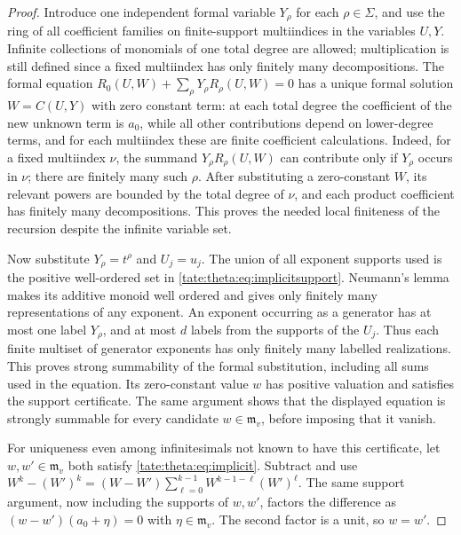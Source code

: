 \documentclass[11pt,letterpaper]{article}
\theoremstyle{definition}
\newcommand{\m}{\mathfrak m}
\begin{document}
\begin{proof}
Introduce one independent formal variable $Y_\rho$ for each
$\rho\in\Sigma$, and use the ring of all coefficient families on
finite-support multiindices in the variables $U,Y$. Infinite collections of
monomials of one total degree are allowed; multiplication is still defined
since a fixed multiindex has only finitely many decompositions. The formal
equation $R_0(U,W)+\sum_\rho Y_\rho R_\rho(U,W)=0$ has a unique formal
solution $W=C(U,Y)$ with zero constant term: at each total degree the
coefficient of the new unknown term is $a_0$, while all other contributions
depend on lower-degree terms, and for each multiindex these are finite
coefficient calculations. Indeed, for a fixed multiindex $\nu$, the
summand $Y_\rho R_\rho(U,W)$ can contribute only if $Y_\rho$ occurs
in $\nu$; there are finitely many such $\rho$. After substituting a
zero-constant $W$, its relevant powers are bounded by the total degree
of $\nu$, and each product coefficient has finitely many decompositions.
This proves the needed local finiteness of the recursion despite the
infinite variable set.

Now substitute $Y_\rho=t^\rho$ and $U_j=u_j$. The union of all exponent
supports used is the positive well-ordered set in
\eqref{tate:theta:eq:implicitsupport}. Neumann's lemma makes its additive
monoid well ordered and gives only finitely many representations of any
exponent. An exponent occurring as a generator has at most one label
$Y_\rho$, and at most $d$ labels from the supports of the $U_j$.
Thus each finite multiset of generator exponents has only finitely many
labelled realizations. This proves strong summability of the formal
substitution, including all sums used in the equation. Its zero-constant
value $w$ has positive valuation and satisfies the support certificate.
The same argument shows that the displayed equation is strongly
summable for every candidate $w\in\m_v$, before imposing that it vanish.

For uniqueness even among infinitesimals not known to have this
certificate, let $w,w'\in\m_v$ both satisfy \eqref{tate:theta:eq:implicit}.
Subtract and use
$W^k-(W')^k=(W-W')\sum_{\ell=0}^{k-1}W^{k-1-\ell}(W')^\ell$. The same
support argument, now including the supports of $w,w'$, factors the
difference as $(w-w')(a_0+\eta)=0$ with $\eta\in\m_v$. The second factor is
a unit, so $w=w'$.
\end{proof}
\end{document}
